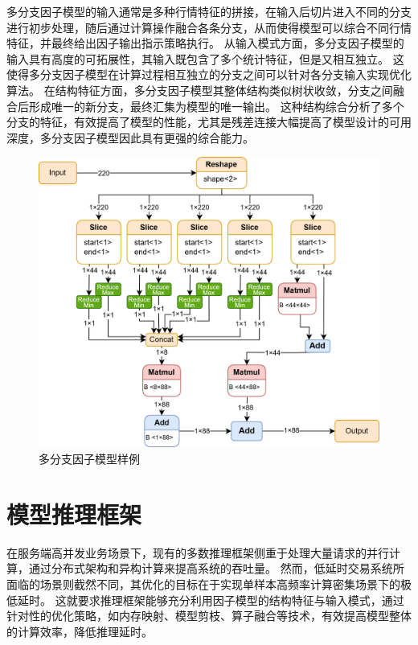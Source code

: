 多分支因子模型的输入通常是多种行情特征的拼接，在输入后切片进入不同的分支进行初步处理，随后通过计算操作融合各条分支，从而使得模型可以综合不同行情特征，并最终给出因子输出指示策略执行。
从输入模式方面，多分支因子模型的输入具有高度的可拓展性，其输入既包含了多个统计特征，但是又相互独立。
这使得多分支因子模型在计算过程相互独立的分支之间可以针对各分支输入实现优化算法。
在结构特征方面，多分支因子模型其整体结构类似树状收敛，分支之间融合后形成唯一的新分支，最终汇集为模型的唯一输出。
这种结构综合分析了多个分支的特征，有效提高了模型的性能，尤其是残差连接\cite{he2015deepresiduallearningimage}大幅提高了模型设计的可用深度，多分支因子模型因此具有更强的综合能力。
\begin{figure}[h]
    \centering
    \includegraphics[width=1\textwidth]{image/chap02/models1.png}
    \caption{多分支因子模型样例}
    \label{fig:models}
\end{figure}


\section{模型推理框架}

在服务端高并发业务场景下，现有的多数推理框架侧重于处理大量请求的并行计算，通过分布式架构和异构计算来提高系统的吞吐量。
然而，低延时交易系统所面临的场景则截然不同，其优化的目标在于实现单样本高频率计算密集场景下的极低延时。
这就要求推理框架能够充分利用因子模型的结构特征与输入模式，通过针对性的优化策略，如内存映射、模型剪枝、算子融合等技术，有效提高模型整体的计算效率，降低推理延时。

